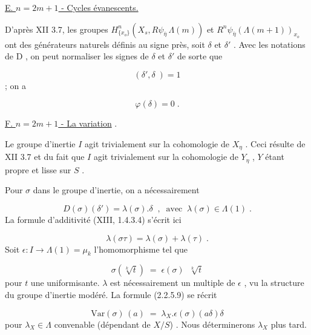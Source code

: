 \underline{E. \quad $n = 2m + 1$ \quad - Cycles évanescents.}

D'après XII 3.7, les groupes $H^n_{\{x_o\}}(X_s,R\psi_{\overline{\eta}} \, \Lambda(m))$ et $R^n\psi_{\overline{\eta}}(\Lambda(m+1))_{x_o}$ ont des générateurs naturels définis au signe près, soit $\delta$ et $\delta'$ . Avec les notations de D , on peut normaliser les signes de $\delta$ et $\delta'$ de sorte que

\begin{equation}\tag{2.2.5.7}
(\delta',\delta \;) = 1
\end{equation}
; on a

\begin{equation}\tag{2.2.5.8}
\varphi(\delta) = 0 \;.
\end{equation}

\underline{F. \quad $n = 2m + 1$ \quad - La variation} .

Le groupe d'inertie $I$ agit trivialement sur la cohomologie de $X_{\eta}$ . Ceci résulte de XII 3.7 et du fait que $I$ agit trivialement sur la cohomologie de $Y_{\eta}$ , $Y$ étant propre et lisse sur $S$ .

Pour $\sigma$ dans le groupe d'inertie, on a nécessairement

\begin{equation}\tag{2.2.5.9}
D(\sigma)(\delta') = \lambda(\sigma).\delta \;\; , \;\; \mathrm{avec} \;\; \lambda(\sigma) \in \Lambda(1) \;.
\end{equation}
La formule d'additivité (XIII, 1.4.3.4) s'écrit ici

\begin{equation*}
\lambda(\sigma\tau) = \lambda(\sigma) + \lambda(\tau) \;.
\end{equation*}
Soit $\epsilon : I \longrightarrow \Lambda(1) = \mu_k$ l'homomorphisme tel que

\begin{equation*}
\sigma(\sqrt[k]{t}) \;=\; \epsilon(\sigma) \;\; \sqrt[k]{t}
\end{equation*}
pour  $t$  une uniformisante.  $\lambda$  est nécessairement un multiple de  $\epsilon$ , vu la structure du groupe d'inertie modéré. La formule (2.2.5.9) se récrit

\begin{equation}\tag{2.2.5.10}
\mathrm{Var}(\sigma)\,(a) \;=\; \lambda_X . \epsilon(\sigma)(a\delta)\delta
\end{equation}
pour  $\lambda_X \in \Lambda$  convenable (dépendant de  $X/S$) . Nous déterminerons  $\lambda_X$  plus tard.

